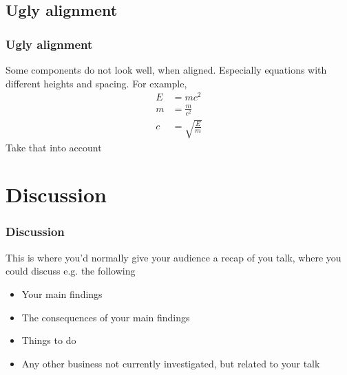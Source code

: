 \documentclass[aspectratio43]{beamer}
\begin{document}
\subsection{Ugly alignment}
\begin{frame}
\frametitle{Ugly alignment}
	Some components do not look well, when aligned. Especially equations with different heights and spacing. For example,
	\begin{align}
	E &=  mc^2 \\
	m &= \frac{m}{c^2} \\
	c &= \sqrt{\frac{E}{m}}	
	\end{align}
	Take that into account
\end{frame}

\section{Discussion}
\begin{frame}
\frametitle{Discussion}
	This is where you'd normally give your audience a recap of you talk, where you could discuss e.g. the following

	\begin{itemize}
		\item Your main findings
		\item The consequences of your main findings
		\item Things to do
		\item Any other business not currently investigated, but related to your talk
	\end{itemize}	
\end{frame}
\end{document}
